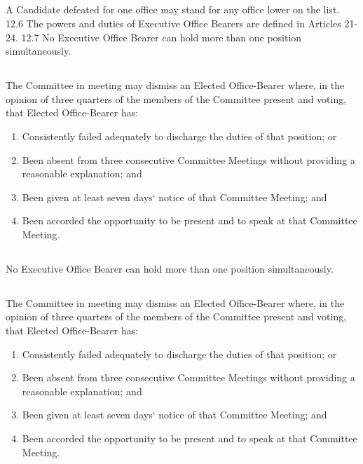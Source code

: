 \documentclass[10.5pt]{article}
\begin{document}
\subsection{} A Candidate defeated for one office may stand for any office lower on the list. 12.6 The powers and duties of Executive Office Bearers are defined in Articles 21-24. 12.7 No Executive Office Bearer can hold more than one position simultaneously. 
\subsection{} The Committee in meeting may dismiss an Elected Office-Bearer where, in the opinion of three quarters of the members of the Committee present and voting, that Elected Office-Bearer has: 

\begin{enumerate} [label=(\alph*)]
    \item Consistently failed adequately to discharge the duties of that position; or 
    \item  Been absent from three consecutive Committee Meetings without providing a reasonable explanation; and 
    \item  Been given at least seven days‘ notice of that Committee Meeting; and \item  Been accorded the opportunity to be present and to speak at that Committee Meeting.
\end{enumerate}

\subsection{} No Executive Office Bearer can hold more than one position simultaneously.
\subsection{} The Committee in meeting may dismiss an Elected Office-Bearer where, in the opinion of
three quarters of the members of the Committee present and voting, that Elected Office-Bearer has:

\begin{enumerate}[label=(\alph*)]
    \item Consistently failed adequately to discharge the duties of that position; or
    \item Been absent from three consecutive Committee Meetings without providing a reasonable explanation; and
    \item Been given at least seven days‘ notice of that Committee Meeting; and
    \item Been accorded the opportunity to be present and to speak at that Committee Meeting.
    \newline
\end{enumerate}
\end{document}
